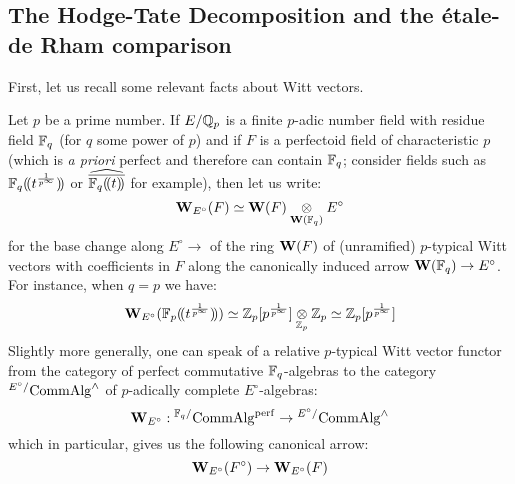         \subsection{The Hodge-Tate Decomposition and the \'etale-de Rham comparison}
            First, let us recall some relevant facts about Witt vectors.
            \begin{convention} \label{conv: relative_witt_vectors}
                Let $p$ be a prime number. If $E/\mathbb{Q}_p$ is a finite $p$-adic number field with residue field $\mathbb{F}_q$ (for $q$ some power of $p$) and if $F$ is a perfectoid field of characteristic $p$ (which is \textit{a priori} perfect and therefore can contain $\mathbb{F}_q$; consider fields such as $\mathbb{F}_q(\!(t^{\frac{1}{p^{\infty}}})\!)$ or $\widehat{\overline{\mathbb{F}_q(\!(t)\!)}}$ for example), then let us write:
                    $$\W_{E^{\circ}}(F) \cong \W(F) \tensor_{\W(\F_q)} E^{\circ}$$
                for the base change along $E^{\circ} \to $ of the ring $\mathbf{W}(F)$ of (unramified) $p$-typical Witt vectors with coefficients in $F$ along the canonically induced arrow $\mathbf{W}(\mathbb{F}_q) \to E^{\circ}$. For instance, when $q = p$ we have:
                    $$\W_{E^{\circ}}(\F_p(\!(t^{\frac{1}{p^{\infty}}})\!)) \cong \Z_p[p^{\frac{1}{p^{\infty}}}] \tensor_{\Z_p} \Z_p \cong \Z_p[p^{\frac{1}{p^{\infty}}}]$$
                Slightly more generally, one can speak of a relative $p$-typical Witt vector functor from the category of perfect commutative $\mathbb{F}_q$-algebras to the category ${}^{E^{\circ}/}\mathrm{Comm}\mathrm{Alg}^{\wedge}$ of $p$-adically complete $E^{\circ}$-algebras:
                    $$\mathbf{W}_{E^{\circ}}: {}^{\mathbb{F}_q/}\mathrm{Comm}\mathrm{Alg}^{\mathrm{perf}} \to {}^{E^{\circ}/}\mathrm{Comm}\mathrm{Alg}^{\wedge}$$
                which in particular, gives us the following canonical arrow:
                    $$\mathbf{W}_{E^{\circ}}(F^{\circ}) \to \mathbf{W}_{E^{\circ}}(F)$$
            \end{convention}
        

